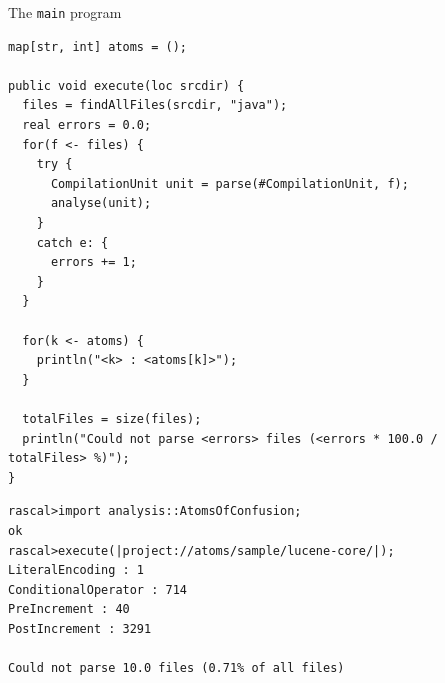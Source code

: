 \documentclass{beamer}
\begin{document}
\begin{frame}[fragile]
  \begin{block}{The \texttt{main} program}

    \begin{lstlisting}[language=Rascal]
map[str, int] atoms = ();

public void execute(loc srcdir) {
  files = findAllFiles(srcdir, "java");
  real errors = 0.0; 
  for(f <- files) {
    try { 
      CompilationUnit unit = parse(#CompilationUnit, f); 
      analyse(unit);
    }
    catch e: {
      errors += 1;
    }
  }
	
  for(k <- atoms) {
    println("<k> : <atoms[k]>"); 
  }
	
  totalFiles = size(files);
  println("Could not parse <errors> files (<errors * 100.0 / totalFiles> %)"); 
}
    \end{lstlisting}
    \end{block}
\end{frame}

\begin{frame}[fragile]
\begin{verbatim}
rascal>import analysis::AtomsOfConfusion;
ok
rascal>execute(|project://atoms/sample/lucene-core/|);
LiteralEncoding : 1
ConditionalOperator : 714
PreIncrement : 40
PostIncrement : 3291

Could not parse 10.0 files (0.71% of all files)  
\end{verbatim}
  \end{frame}
\end{document}
